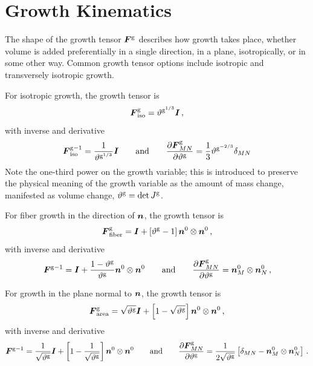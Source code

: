 \documentclass[10pt,letterpaper,oneside]{report}
\newcommand{\ten}[1]{\mbox{\boldmath $#1$}{}}
\newcommand{\scas}[1]{\mbox{{\scriptsize{${\rm{#1}}$}}}{}}
\begin{document}
\section{Growth Kinematics}
\label{kinematics}
The shape of the growth tensor $\ten{F}^{\scas{g}}$ describes how growth takes place, whether volume is added preferentially in a single direction, in a plane, isotropically, or in some other way. Common growth tensor options include isotropic and transversely isotropic growth.  

For isotropic growth, the growth tensor is
\begin{equation}
\ten{F}^{\scas{g}}_{\scas{iso}} = \vartheta^{\scas{g}^{1/3}} \ten{I} \, , 
\label{Fg_iso}
\end{equation}
with inverse and derivative
\begin{equation}
\ten{F}^{\scas{g}-1}_{\scas{iso}} = \frac{1}{\vartheta^{\scas{g}^{1/3}}} \ten{I}
\qquad \mbox{and} \qquad
\frac{\partial \ten{F}^{\scas{g}}_{MN} }{\partial \vartheta^{\scas{g}}} = \frac{1}{3} \vartheta^{\scas{g}^{-2/3}} \delta_{MN}
\label{Fg_iso2}
\end{equation}
Note the one-third power on the growth variable; this is introduced to preserve the physical meaning of the growth variable as the amount of mass change, manifested as volume change, $\vartheta^{\scas{g}} = \det J^{\scas{g}}$.

For fiber growth in the direction of $\ten{n}$, the growth tensor is
\begin{equation}
\ten{F}^{\scas{g}}_{\scas{fiber}} = \ten{I} + \left[ \vartheta^{\scas{g}} - 1 \right] \ten{n}^0 \otimes \ten{n}^0 \, , 
\label{Fg_fiber} 
\end{equation}
with inverse and derivative 
\begin{equation}
\ten{F}^{\scas{g}-1} = \ten{I} + \frac{1 - \vartheta^{\scas{g}}}{\vartheta^{\scas{g}}} \ten{n}^0 \otimes \ten{n}^0  
\qquad \mbox{and} \qquad
\frac{\partial \ten{F}^{\scas{g}}_{MN} }{\partial \vartheta^{\scas{g}}} = \ten{n}^0_M \otimes \ten{n}^0_N  \, , 
\label{Fg_fiber2} 
\end{equation}

For growth in the plane normal to $\ten{n}$, the growth tensor is
\begin{equation}
\ten{F}^{\scas{g}}_{\scas{area}} = \sqrt{\vartheta^{\scas{g}}} \ten{I} + \left[ 1 - \sqrt{\vartheta^{\scas{g}}} \right] \ten{n}^0 \otimes \ten{n}^0 \, , 
\label{Fg_planar}
\end{equation}
with inverse and derivative
\begin{equation}
\ten{F}^{\scas{g}-1} = \frac{1}{\sqrt{\vartheta^{\scas{g}}}} \ten{I} + \left[1-\frac{1}{\sqrt{\vartheta^{\scas{g}}}} \right] \ten{n}^0 \otimes \ten{n}^0  
\qquad \mbox{and} \qquad
\frac{\partial \ten{F}^{\scas{g}}_{MN} }{\partial \vartheta^{\scas{g}}} = \frac{1}{2\sqrt{\vartheta^{\scas{g}}}} \left[ \delta_{MN} - \ten{n}^0_M \otimes \ten{n}^0_N \right] \, .
\label{Fg_planar2}
\end{equation}
\end{document}
